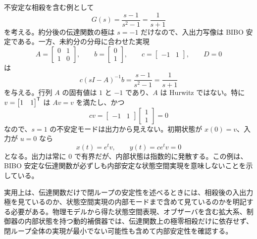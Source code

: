 不安定な相殺を含む例として
\begin{equation}
  G(s)=\frac{s-1}{s^2-1}=\frac{1}{s+1}
\end{equation}
を考える。約分後の伝達関数の極は $s=-1$ だけなので、入出力写像は BIBO 安定である。一方、未約分の分母に合わせた実現
\begin{equation}
  A=\begin{bmatrix}0&1\\1&0\end{bmatrix},\qquad
  b=\begin{bmatrix}0\\1\end{bmatrix},\qquad
  c=\begin{bmatrix}-1&1\end{bmatrix},\qquad D=0
  \label{eq:hidden-unstable-realization}
\end{equation}
は
\begin{equation}
  c(sI-A)^{-1}b
  =\frac{s-1}{s^2-1}
  =\frac{1}{s+1}
\end{equation}
を与える。行列 $A$ の固有値は $1$ と $-1$ であり、$A$ は Hurwitz ではない。特に $v=\begin{bmatrix}1&1\end{bmatrix}^{\mathsf{T}}$ は $Av=v$ を満たし、かつ
\begin{equation}
  cv=\begin{bmatrix}-1&1\end{bmatrix}
    \begin{bmatrix}1\\1\end{bmatrix}=0
\end{equation}
なので、$s=1$ の不安定モードは出力から見えない。初期状態が $x(0)=v$、入力が $u=0$ なら
\begin{equation}
  x(t)=e^t v,\qquad y(t)=ce^t v=0
\end{equation}
となる。出力は常に 0 で有界だが、内部状態は指数的に発散する。この例は、BIBO 安定な伝達関数が必ずしも内部安定な状態空間実現を意味しないことを示している。

実用上は、伝達関数だけで閉ループの安定性を述べるときには、相殺後の入出力極を見ているのか、状態空間実現の内部モードまで含めて見ているのかを明記する必要がある。物理モデルから得た状態空間表現、オブザーバを含む拡大系、制御器の内部状態を持つ動的補償器では、伝達関数上の極零相殺だけに依存せず、閉ループ全体の実現が最小でない可能性も含めて内部安定性を確認する。
